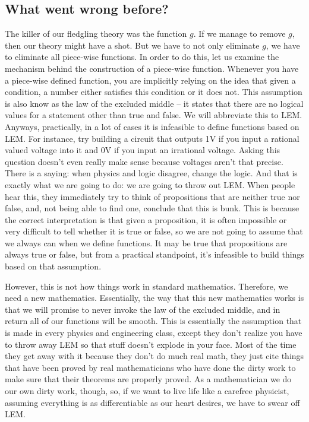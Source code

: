 \documentclass[]{book}
\begin{document}
\hypertarget{what-went-wrong-before}{%
\subsection{What went wrong before?}\label{what-went-wrong-before}}

The killer of our fledgling theory was the function $g$. If we manage to remove $g$, then our theory might have a shot. But we have to not only eliminate $g$, we have to eliminate all piece-wise functions. In order to do this, let us examine the mechanism behind the construction of a piece-wise function. Whenever you have a piece-wise defined function, you are implicitly relying on the idea that given a condition, a number either satisfies this condition or it does not. This assumption is also know as the law of the excluded middle -- it states that there are no logical values for a statement other than true and false. We will abbreviate this to LEM. Anyways, practically, in a lot of cases it is infeasible to define functions based on LEM. For instance, try building a circuit that outputs 1V if you input a rational valued voltage into it and 0V if you input an irrational voltage. Asking this question doesn't even really make sense because voltages aren't that precise. There is a saying: when physics and logic disagree, change the logic. And that is exactly what we are going to do: we are going to throw out LEM. When people hear this, they immediately try to think of propositions that are neither true nor false, and, not being able to find one, conclude that this is bunk. This is because the correct interpretation is that given a proposition, it is often impossible or very difficult to tell whether it is true or false, so we are not going to assume that we always can when we define functions. It may be true that propositions are always true or false, but from a practical standpoint, it's infeasible to build things based on that assumption.

However, this is not how things work in standard mathematics. Therefore, we need a new mathematics. Essentially, the way that this new mathematics works is that we will promise to never invoke the law of the excluded middle, and in return all of our functions will be smooth. This is essentially the assumption that is made in every physics and engineering class, except they don't realize you have to throw away LEM so that stuff doesn't explode in your face. Most of the time they get away with it because they don't do much real math, they just cite things that have been proved by real mathematicians who have done the dirty work to make sure that their theorems are properly proved. As a mathematician we do our own dirty work, though, so, if we want to live life like a carefree physicist, assuming everything is as differentiable as our heart desires, we have to swear off LEM.
\end{document}
